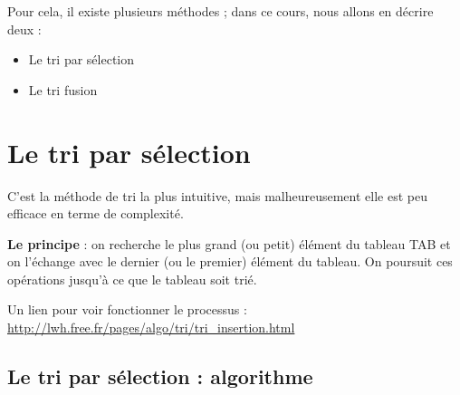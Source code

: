 \documentclass[a4paper,french]{article}
\begin{document}
Pour cela, il existe plusieurs méthodes ; dans ce cours, nous allons en décrire deux :

\begin{itemize}
\item Le tri par sélection
\item Le tri fusion
\end{itemize}



\section{Le tri par sélection}

C'est la méthode de tri la plus intuitive, mais malheureusement elle est peu efficace en terme de complexité.


\textbf{Le principe} : on recherche le plus grand (ou petit) élément du tableau TAB et on l'échange avec le dernier (ou le premier) élément du tableau. On poursuit ces opérations jusqu'à ce que le tableau soit trié.
\medskip

Un lien pour voir fonctionner le processus : 
\url{http://lwh.free.fr/pages/algo/tri/tri_insertion.html}
\medskip

\subsection{Le tri par sélection : algorithme}
\end{document}
